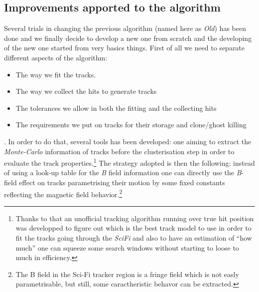 \documentclass[paper=a4, fontsize=10pt]{scrartcl}
\numberwithin{equation}{section}		%
\numberwithin{figure}{section}			%
\numberwithin{table}{section}				%
\begin{document}
\subsection{Improvements apported to the algorithm}
Several trials in changing the previous algorithm (named here as \textit{Old}) has been done and we finally decide to develop a new one from scratch and the developing of the new one started from very basics things. First of all we need to separate different aspects of the algorithm: 
\begin{itemize}
\item{The way we fit the tracks.}
\item{The way we collect the hits to generate tracks}
\item{The tolerances we allow in both the fitting and the collecting hits}
\item{The requirements we put on tracks for their storage and clone/ghost killing}
\end{itemize}.
In order to do that, several tools has been developed: one aiming to extract the \textit{Monte-Carlo} information of tracks before the clusterisation step in order to evaluate the track properties.\footnote{Thanks to that an unofficial tracking algorithm running over true hit position was developped to figure out which is the best track model to use in order to fit the tracks going through the \textit{SciFi} and also to have an estimation of ``how much'' one can squeeze some search windows without starting to loose to much in efficiency.} The strategy adopted is then the following: instead of using a look-up table for the \textit{B} field information one can directly use the \textit{B}-field effect on tracks parametrising their motion by some fixed constants reflecting the magnetic field behavior.\footnote{The B field in the Sci-Fi tracker region is a fringe field which is not easly parametrisable, but still, some caractheristic behavor can be extracted.}
\end{document}

